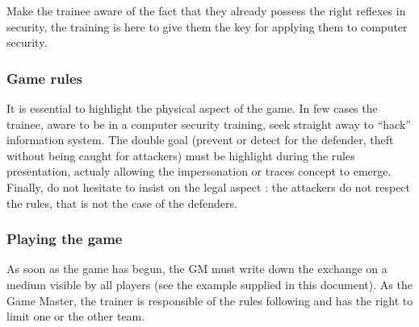 \documentclass[11pt]{article} %
\begin{document}
Make the trainee aware of the fact that they already possess the right reflexes 
in security, the training is here to give them the key for applying them to computer 
security.


\subsubsection{Game rules}
It is essential to highlight the physical aspect of the game. In few cases
the trainee, aware to be in a computer security training, seek straight away to 
``hack'' information system. The double goal (prevent or detect for the defender, 
theft without being caught for attackers) must be highlight during the rules 
presentation, actualy allowing the impersonation or traces concept to emerge. 
Finally, do not hesitate to insist on the legal aspect : the attackers do not respect 
the rules, that is not the case of the defenders. 


\subsubsection{Playing the game}
As soon as the game has begun, the GM must write down the exchange on a medium 
visible by all players (see the example supplied in this document). As the Game Master, 
the trainer is responsible of the rules following and has the right to limit one or the other team.
\end{document}
